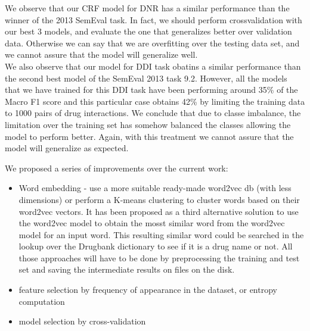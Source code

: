 We observe that our CRF model for DNR has a similar performance than the winner of the 2013 SemEval task. In fact, we should perform crossvalidation with our best 3 models, and evaluate the one that generalizes better over validation data. Otherwise we can say that we are overfitting over the testing data set, and we cannot assure that the model will generalize well.\\
We also observe that our model for DDI task obatins a similar performance than the second best model of the SemEval 2013 task 9.2. However, all the models that we have trained for this DDI task have been performing around 35\% of the Macro F1 score and this particular case obtains 42\% by limiting the training data to 1000 pairs of drug interactions. We conclude that due to classe imbalance, the limitation over the training set has somehow balanced the classes allowing the model to perform better. Again, with this treatment we cannot assure that the model will generalize as expected.


We proposed a series of improvements over the current work:
\begin{itemize}
    \item Word embedding - use a more suitable ready-made word2vec db (with less dimensions) or perform a K-means clustering to cluster words based on their word2vec vectors. It has been proposed as a third alternative solution to use the word2vec model to obtain the mosst similar word from the word2vec model for an input word. This resulting similar word could be searched in the lookup over the Drugbank dictionary to see if it is a drug name or not. All those approaches will have to be done by preprocessing the training and test set and saving the intermediate results on files on the disk.

    \item feature selection by frequency of appearance in the dataset, or entropy computation
    \item model selection by cross-validation

\end{itemize}
